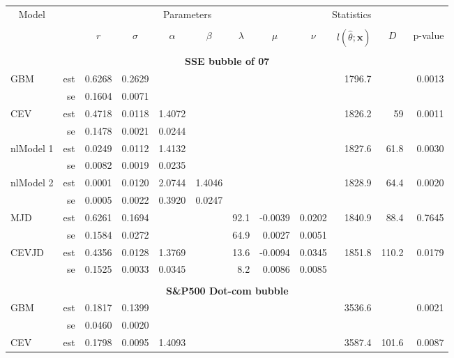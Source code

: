 \begin{table}
	\newcommand{\ra}[1]{\renewcommand{\arraystretch}{#1}}
	\ra{0.9}
	\centering
	{\setlength{\tabcolsep}{0.20em}
		\begin{tabular}{@{}lrrrrrrrrrrr@{}}
			\toprule
			\multicolumn{1}{c}{Model}& & \multicolumn{6}{c}{Parameters} & \multicolumn{3}{c}{Statistics}\\
			\cmidrule(r){1-1} \cmidrule(r){3-8} \cmidrule(r){9-11}\\
			& & \multicolumn{1}{c}{$r$} & \multicolumn{1}{c}{$\sigma$} & \multicolumn{1}{c}{$\alpha$} & \multicolumn{1}{c}{$\beta$} & \multicolumn{1}{c}{$\lambda$} & \multicolumn{1}{c}{$\mu$} & \multicolumn{1}{c}{$\nu$} &
			$l(\hat{\theta};\mathbf{x})$ & \multicolumn{1}{c}{$D$} & \multicolumn{1}{c}{p-value}\\
			\midrule
			\\
			\multicolumn{12}{c}{\textbf{SSE bubble of 07}}\\
			GBM& est & 0.6268  & 0.2629  & & & & & & 1796.7 &	&0.0013\\
			& se & 0.1604& 0.0071& & & & & & & \\
			CEV& est & 0.4718 & 0.0118 & 1.4072 & & & & & 1826.2 & 59 & 0.0011\\
			& se & 0.1478 & 0.0021 & 0.0244 \\
			nlModel 1& est & 0.0249 &  0.0112 & 1.4132 & & & & &  1827.6 & 61.8 & 0.0030\\
			& se & 0.0082& 0.0019& 0.0235& \\
			nlModel 2 & est & 0.0001 & 0.0120 & 2.0744 & 1.4046 & & & & 1828.9  & 64.4 & 0.0020\\
			& se & 0.0005 & 0.0022 & 0.3920 & 0.0247 & \\
			MJD& est & 0.6261 & 0.1694& & &  92.1& -0.0039& 0.0202& 1840.9 & 88.4 & 0.7645 \\
			& se & 0.1584& 0.0272& & & 64.9& 0.0027& 0.0051& & \\
			CEVJD & est & 0.4356 & 0.0128 & 1.3769 & & 13.6 & -0.0094 & 0.0345 & 1851.8 & 110.2 & 0.0179 \\
			& se & 0.1525 & 0.0033 & 0.0345 & &  8.2 & 0.0086 & 0.0085 \\
			\\
			\multicolumn{12}{c}{\textbf{S\&P500 Dot-com bubble}}\\
			GBM& est & 0.1817  & 0.1399  &  & & & & &  3536.6  & & 0.0021\\
			& se & 0.0460& 0.0020& & & & & & &  \\
			CEV& est & 0.1798 & 0.0095 & 1.4093 & & &  & & 3587.4 & 101.6 & 0.0087\\

\end{tabular}}
\end{table}
